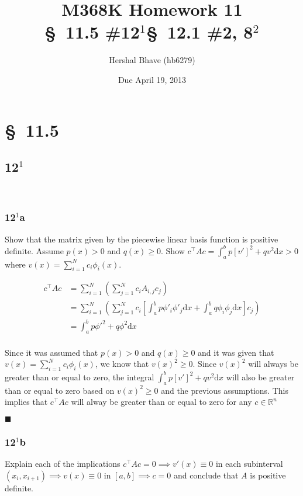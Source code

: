 \documentclass[12pt]{article}
\title{M368K Homework 11 \\
  \normalsize{\S~11.5 \#12$^1$\quad \S~12.1 \#2, 8$^2$}}
\author{Hershal Bhave (hb6279)}
\date{Due April 19, 2013}
\newcommand{\dd}[1]{\mathrm{d}{#1}}
\begin{document}
\maketitle

\section{\S~11.5}
\subsection{12$^1$}\
\subsubsection{12$^1$a}
Show that the matrix given by the piecewise linear basis function is
positive definite. Assume $p(x)>0$ and $q(x)\geq 0$. Show $c^\intercal
Ac = \int_a^bp[v']^2+qv^2\dd{x} > 0$ where
$v(x)=\sum_{i=1}^Nc_i\phi_i(x)$.

\hfill

\begin{equation}
  \label{eq:12_1_1}
  \begin{aligned}
    c^\intercal Ac &= \sum_{i=1}^N \left(\sum_{j=1}^N c_i A_{i,j}c_j\right) \\
    &=\sum_{i=1}^N \left(\sum_{j=1}^N c_i \left[\int_a^b p \phi'_i \phi'_j
        \dd{x} + \int_a^b q \phi_i \phi_j \dd{x}\right] c_j\right) \\
    &= \int_a^b p \phi'^2 + q \phi^2 \dd{x} \\
  \end{aligned}
\end{equation}

Since it was assumed that $p(x)>0$ and $q(x)\geq0$ and it was given
that $v(x)=\sum_{i=1}^Nc_i\phi_i(x)$, we know that
$v(x)^2\geq0$. Since $v(x)^2$ will always be greater than or equal to
zero, the integral $\int_a^bp[v']^2+qv^2\dd{x}$ will also be greater
than or equal to zero based on $v(x)^2\geq0$ and the previous
assumptions. This implies that $c^\intercal Ac$ will alway be greater
than or equal to zero for any $c \in \mathbb{R}^n$

\hfill $\blacksquare$

\subsubsection{12$^1$b}
Explain each of the implications $c^\intercal
Ac =0 \implies v'(x) \equiv 0$ in each subinterval $(x_i,x_{i+1})
\implies v(x) \equiv 0$ in $[a,b] \implies c=0$ and conclude that $A$
is positive definite.
\end{document}
